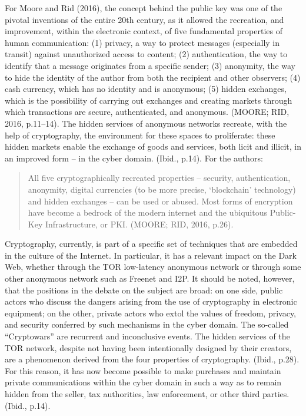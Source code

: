For Moore and Rid (2016), the concept behind the public key was one of the pivotal inventions of the entire 20th century, as it allowed the recreation, and improvement, within the electronic context, of five fundamental properties of human communication: (1) privacy, a way to protect messages (especially in transit) against unauthorized access to content; (2) authentication, the way to identify that a message originates from a specific sender; (3) anonymity, the way to hide the identity of the author from both the recipient and other observers; (4) cash currency, which has no identity and is anonymous; (5) hidden exchanges, which is the possibility of carrying out exchanges and creating markets through which transactions are secure, authenticated, and anonymous. (MOORE; RID, 2016, p.11--14). The hidden services of anonymous networks recreate, with the help of cryptography, the environment for these spaces to proliferate: these hidden markets enable the exchange of goods and services, both licit and illicit, in an improved form -- in the cyber domain. (Ibid., p.14). For the authors:

\begin{quote}
All five cryptographically recreated properties -- security, authentication, anonymity, digital currencies (to be more precise, `blockchain' technology) and hidden exchanges -- can be used or abused. Most forms of encryption have become a bedrock of the modern internet and the ubiquitous Public-Key Infrastructure, or PKI. (MOORE; RID, 2016, p.26).
\end{quote}

Cryptography, currently, is part of a specific set of techniques that are embedded in the culture of the Internet. In particular, it has a relevant impact on the Dark Web, whether through the TOR low-latency anonymous network or through some other anonymous network such as Freenet and I2P. It should be noted, however, that the positions in the debate on the subject are broad: on one side, public actors who discuss the dangers arising from the use of cryptography in electronic equipment; on the other, private actors who extol the values of freedom, privacy, and security conferred by such mechanisms in the cyber domain. The so-called ``Cryptowars'' are recurrent and inconclusive events. The hidden services of the TOR network, despite not having been intentionally designed by their creators, are a phenomenon derived from the four properties of cryptography. (Ibid., p.28). For this reason, it has now become possible to make purchases and maintain private communications within the cyber domain in such a way as to remain hidden from the seller, tax authorities, law enforcement, or other third parties. (Ibid., p.14).

